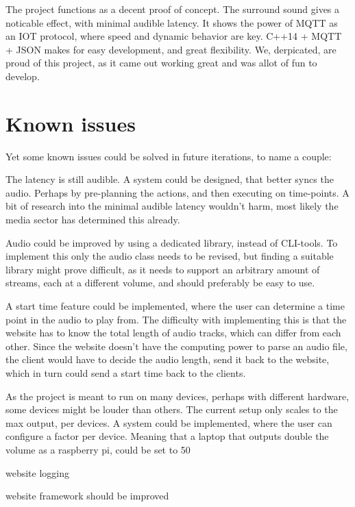 The project functions as a decent proof of concept. The surround sound gives a noticable effect, with minimal audible latency.
It shows the power of MQTT as an IOT protocol, where speed and dynamic behavior are key. C++14 + MQTT + JSON makes for easy development, and great flexibility.
We, derpicated, are proud of this project, as it came out working great and was allot of fun to develop.

\section{Known issues}
Yet some known issues could be solved in future iterations, to name a couple:


The latency is still audible. A system could be designed, that better syncs the audio. Perhaps by pre-planning the actions, and then executing on time-points.
A bit of research into the minimal audible latency wouldn't harm, most likely the media sector has determined this already.


Audio could be improved by using a dedicated library, instead of CLI-tools.
To implement this only the audio class needs to be revised, but finding a suitable library might prove difficult,
as it needs to support an arbitrary amount of streams, each at a different volume, and should preferably be easy to use.


A start time feature could be implemented, where the user can determine a time point in the audio to play from.
The difficulty with implementing this is that the website has to know the total length of audio tracks, which can differ from each other.
Since the website doesn't have the computing power to parse an audio file, the client would have to decide the audio length, send it back to the website, which in turn could send a start time back to the clients.


As the project is meant to run on many devices, perhaps with different hardware, some devices might be louder than others.
The current setup only scales to the max output, per devices. A system could be implemented, where the user can configure a factor per device.
Meaning that a laptop that outputs double the volume as a raspberry pi, could be set to 50%


website logging

website framework should be improved
